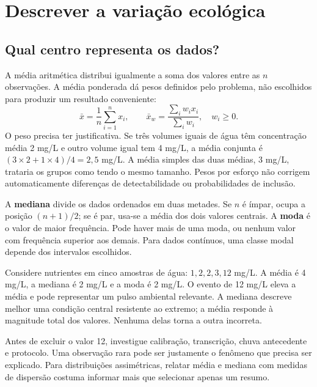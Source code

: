 \chapter{Descrever a variação ecológica}

\section{Qual centro representa os dados?}
A média aritmética distribui igualmente a soma dos valores entre as $n$ observações. A média ponderada dá pesos definidos pelo problema, não escolhidos para produzir um resultado conveniente:
\begin{equation}\bar{x}=\frac{1}{n}\sum_{i=1}^{n}x_i,\qquad
\bar{x}_w=\frac{\sum_i w_i x_i}{\sum_i w_i},\quad w_i\geq0.\end{equation}
O peso precisa ter justificativa. Se três volumes iguais de água têm concentração média 2 mg/L e outro volume igual tem 4 mg/L, a média conjunta é $(3\times2+1\times4)/4=2{,}5$ mg/L. A média simples das duas médias, 3 mg/L, trataria os grupos como tendo o mesmo tamanho. Pesos por esforço não corrigem automaticamente diferenças de detectabilidade ou probabilidades de inclusão.

A \textbf{mediana} divide os dados ordenados em duas metades. Se $n$ é ímpar, ocupa a posição $(n+1)/2$; se é par, usa-se a média dos dois valores centrais. A \textbf{moda} é o valor de maior frequência. Pode haver mais de uma moda, ou nenhum valor com frequência superior aos demais. Para dados contínuos, uma classe modal depende dos intervalos escolhidos.

\begin{exemplo}
Considere nutrientes em cinco amostras de água: $1,2,2,3,12$ mg/L. A média é 4 mg/L, a mediana é 2 mg/L e a moda é 2 mg/L. O evento de 12 mg/L eleva a média e pode representar um pulso ambiental relevante. A mediana descreve melhor uma condição central resistente ao extremo; a média responde à magnitude total dos valores. Nenhuma delas torna a outra incorreta.
\end{exemplo}

Antes de excluir o valor 12, investigue calibração, transcrição, chuva antecedente e protocolo. Uma observação rara pode ser justamente o fenômeno que precisa ser explicado. Para distribuições assimétricas, relatar média e mediana com medidas de dispersão costuma informar mais que selecionar apenas um resumo.

